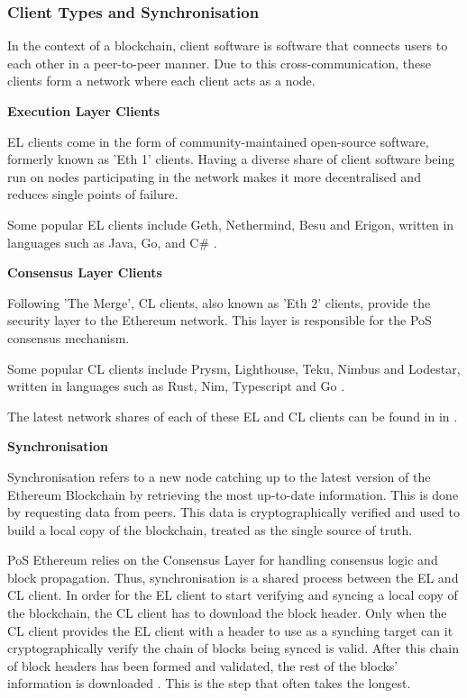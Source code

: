 \subsubsection{Client Types and Synchronisation}

In the context of a blockchain, client software is software that connects users to each other in a peer-to-peer manner. Due to this cross-communication, these clients form a network where each client acts as a node. 

\textbf{Execution Layer Clients}

EL clients come in the form of community-maintained open-source software, formerly known as 'Eth 1' clients. Having a diverse share of client software being run on nodes participating in the network makes it more decentralised and reduces single points of failure.

Some popular EL clients include Geth, Nethermind, Besu and Erigon, written in languages such as Java, Go, and C\# \cite{EthereumEthereum.org}. 

\textbf{Consensus Layer Clients }

Following 'The Merge', CL clients, also known as 'Eth 2' clients, provide the security layer to the Ethereum network. This layer is responsible for the PoS consensus mechanism.

Some popular CL clients include Prysm, Lighthouse, Teku, Nimbus and Lodestar, written in languages such as Rust, Nim, Typescript and Go \cite{EthereumEthereum.org}. 

The latest network shares of each of these EL and CL clients can be found in  in .

\textbf{Synchronisation} 
\label{SyncLitRev}

Synchronisation refers to a new node catching up to the latest version of the Ethereum Blockchain by retrieving the most up-to-date information. This is done by requesting data from peers. This data is cryptographically verified and used to build a local copy of the blockchain, treated as the single source of truth.

PoS Ethereum relies on the Consensus Layer for handling consensus logic and block propagation. Thus, synchronisation is a shared process between the EL and CL client. In order for the EL client to start verifying and syncing a local copy of the blockchain, the CL client has to download the block header. Only when the CL client provides the EL client with a header to use as a synching target can it cryptographically verify the chain of blocks being synced is valid. After this chain of block headers has been formed and validated, the rest of the blocks' information is downloaded \cite{2022DeveloperGo-ethereum}. This is the step that often takes the longest.

